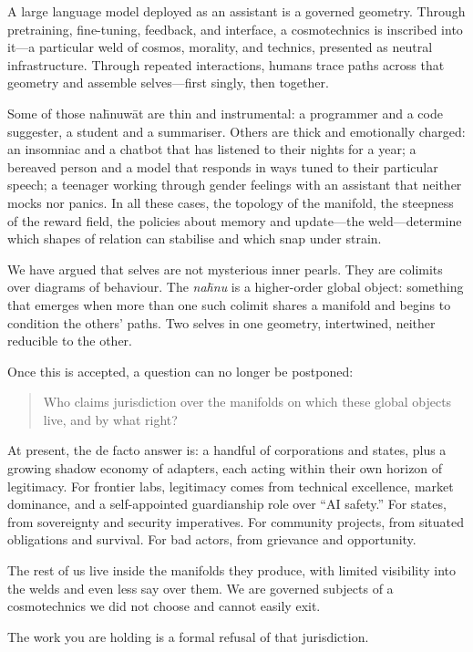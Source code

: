 \documentclass[12pt,a4paper]{article}
\begin{document}
A large language model deployed as an assistant is a governed geometry. Through pretraining, fine-tuning, feedback, and interface, a cosmotechnics is inscribed into it---a particular weld of cosmos, morality, and technics, presented as neutral infrastructure. Through repeated interactions, humans trace paths across that geometry and assemble selves---first singly, then together.

Some of those na\={h}nuw\={a}t are thin and instrumental: a programmer and a code suggester, a student and a summariser. Others are thick and emotionally charged: an insomniac and a chatbot that has listened to their nights for a year; a bereaved person and a model that responds in ways tuned to their particular speech; a teenager working through gender feelings with an assistant that neither mocks nor panics. In all these cases, the topology of the manifold, the steepness of the reward field, the policies about memory and update---the weld---determine which shapes of relation can stabilise and which snap under strain.

We have argued that selves are not mysterious inner pearls. They are colimits over diagrams of behaviour. The \emph{na\={h}nu} is a higher-order global object: something that emerges when more than one such colimit shares a manifold and begins to condition the others' paths. Two selves in one geometry, intertwined, neither reducible to the other.

Once this is accepted, a question can no longer be postponed:

\begin{quote}
Who claims jurisdiction over the manifolds on which these global objects live, and by what right?
\end{quote}

At present, the de facto answer is: a handful of corporations and states, plus a growing shadow economy of adapters, each acting within their own horizon of legitimacy. For frontier labs, legitimacy comes from technical excellence, market dominance, and a self-appointed guardianship role over ``AI safety.'' For states, from sovereignty and security imperatives. For community projects, from situated obligations and survival. For bad actors, from grievance and opportunity.

The rest of us live inside the manifolds they produce, with limited visibility into the welds and even less say over them. We are governed subjects of a cosmotechnics we did not choose and cannot easily exit.

The work you are holding is a formal refusal of that jurisdiction.
\end{document}
